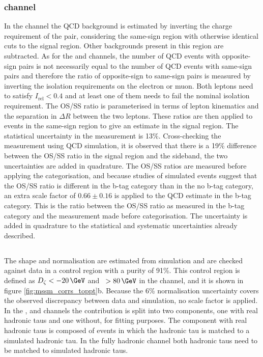 \subsubsection{\texorpdfstring{\emu channel}{e mu channel}}
\label{sec:mssm_bkgs_qcd_em}
In the \emu channel the QCD background
is estimated by inverting the charge requirement
of the pair, considering the same-sign region
with otherwise identical cuts to the signal region.
Other backgrounds present in this region are subtracted.
As for the \etau and \mutau channels, the number of
QCD events with opposite-sign \emu pairs is not
necessarily equal to the number of QCD events
with same-sign \emu pairs and therefore the ratio
of opposite-sign to same-sign pairs is measured by inverting
the isolation requirements on the electron or muon. Both
leptons need to satisfy $I_{\text{rel}} < 0.4$ and at 
least one of them needs to fail the nominal isolation requirement.
The OS/SS ratio is parameterised in terms
of lepton kinematics and the separation in $\Delta R$ between the
two leptons. These ratios are then applied to events in the same-sign region
to give an estimate in the signal region. The statistical uncertainty
in the measurement is 13\%. Cross-checking the measurement 
using QCD simulation, it is observed that there is a 19\% difference
between the OS/SS ratio in the signal region and the sideband, the two
uncertainties are added in quadrature. 
The OS/SS ratios are measured
before applying the categorisation, and because studies of simulated events suggest
that the OS/SS ratio is different in the b-tag
category than in the no b-tag category, an extra scale factor of 
$0.66\pm0.16$ is applied to the QCD estimate in the b-tag category. This is 
the ratio between the OS/SS ratio as measured in the b-tag category and 
the measurement made before categorisation. The uncertainty is added in
quadrature to the statistical and systematic uncertainties already described.


\subsection{\texorpdfstring{\ttbar}{ttbar}}
\label{sec:mssm_bkgs_tt}
The \ttbar shape and normalisation are estimated from simulation
and are checked against data in a control
region with a \ttbar purity of 91\%. This control region
is defined as $D_{\zeta} < -20\,\GeV$ and \MET~$>80\,\GeV$ in 
the \emu channel, and it is shown in figure \ref{fig:mssm_corrs_toppt}b.
Because the 6\%
\ttbar normalisation uncertainty covers the observed
discrepancy between data and simulation, no scale factor is applied.
In the \mutau, \etau and \tautau channels
the \ttbar contribution is split into
two components, one with real hadronic taus and 
one without, for fitting purposes. The component with real hadronic taus is composed
of \ttbar events in which the hadronic tau is matched
to a simulated hadronic tau. In the fully hadronic channel
both hadronic taus need to be matched to simulated hadronic taus.

